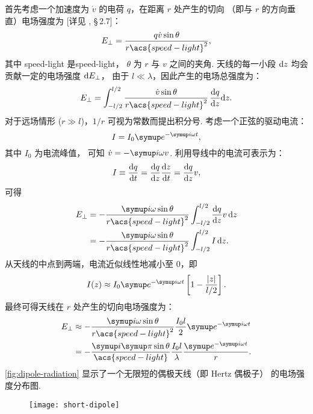 首先考虑一个加速度为 $\dot{v}$ 的电荷 $q$，在距离 $r$ 处产生的切向
（即与 $r$ 的方向垂直）电场强度为 [详见 , \S\,2.7]：
\begin{equation}
  \label{eq:q-efield}
  E_{\perp} = \frac{q \dot{v} \sin\theta}{r \acs{speed-light}^2} ,
\end{equation}
其中
\acs{speed-light} 是\acl{speed-light}，
$\theta$ 为 $r$ 与 $v$ 之间的夹角.
天线的每一小段 $\mathrm{d}z$ 均会贡献一定的电场强度 $\mathrm{d}E_{\perp}$，
由于 $l \ll \lambda$，因此产生的电场总强度为：
\begin{equation}
  \label{eq:dipole-efield1}
  E_{\perp} = \int_{-l/2}^{l/2}
    \frac{\dot{v} \sin\theta}{r \acs{speed-light}^2} \,\diff{q}{z}\D{z} .
\end{equation}
对于远场情形 ($r \gg l$)，$1/r$ 可视为常数而提出积分号.
考虑一个正弦的驱动电流：
\begin{equation}
  \label{eq:dipole-current}
  I = I_0 \Ce^{-\Ci \omega t} ,
\end{equation}
其中 $I_0$ 为电流峰值，
可知 $\dot{v} = -\Ci \omega v$.
利用导线中的电流可表示为：
\begin{equation}
  \label{eq:wire-current}
  I \equiv \frac{\mathrm{d}q}{\mathrm{d}t} = \frac{\mathrm{d}q}{\mathrm{d}z} \frac{\mathrm{d}z}{\mathrm{d}t} = \frac{\mathrm{d}q}{\mathrm{d}z} v ,
\end{equation}
可得
\begin{align}
  \label{eq:dipole-efield2}
  E_{\perp}
    & = -\frac{\Ci\omega \sin\theta}{r \acs{speed-light}^2}
      \int_{-l/2}^{l/2} \diff{q}{z} v \,\D{z} \\
    & = -\frac{\Ci\omega \sin\theta}{r \acs{speed-light}^2}
      \int_{-l/2}^{l/2} I\,\D{z} .
\end{align}
从天线的中点到两端，电流近似线性地减小至 0，即
\begin{equation}
  \label{eq:dipole-current-dist}
  I(z) \approx I_0 \Ce^{-\Ci\omega t}
    \left[ 1 - \frac{|z|}{l/2} \right] .
\end{equation}
最终可得天线在 $r$ 处产生的切向电场强度为：
\begin{align}
  \label{eq:dipole-efield}
  E_{\perp}
    & \approx -\frac{\Ci\omega \sin\theta}{r \acs{speed-light}^2}
      \frac{I_0 l}{2} \Ce^{-\Ci\omega t} \\
    & = -\frac{\Ci\Cpi \sin\theta}{\acs{speed-light}}
      \frac{I_0 l}{\lambda} \frac{\Ce^{-\Ci\omega t}}{r} .
\end{align}
\autoref{fig:dipole-radiation} 显示了一个无限短的偶极天线（即 Hertz 偶极子）
的电场强度分布图.

\begin{figure}[htp]
  \centering
  \texttt{[image: short-dipole]}
  \label{fig:short-dipole}
\end{figure}

